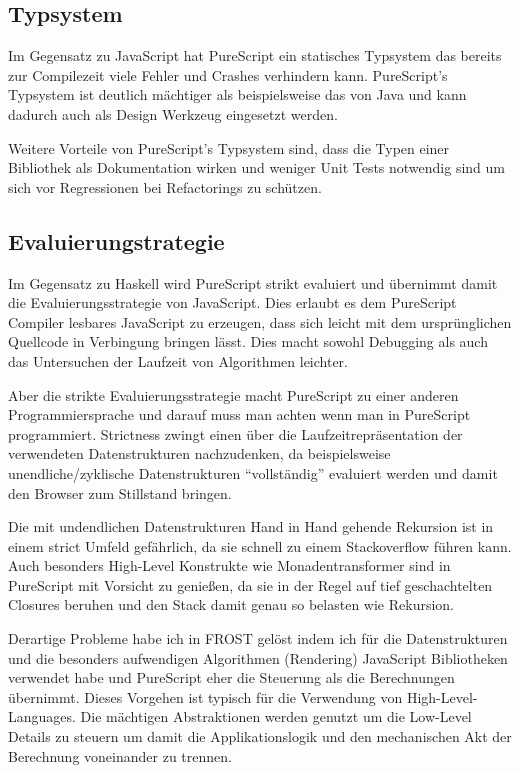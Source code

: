 \subsection*{Typsystem}
Im Gegensatz zu JavaScript hat PureScript ein statisches Typsystem das bereits
zur Compilezeit viele Fehler und Crashes verhindern kann. PureScript's Typsystem
ist deutlich mächtiger als beispielsweise das von Java und kann dadurch auch als
Design Werkzeug eingesetzt werden.

Weitere Vorteile von PureScript's Typsystem sind, dass die Typen einer
Bibliothek als Dokumentation wirken und weniger Unit Tests notwendig sind um
sich vor Regressionen bei Refactorings zu schützen.
\subsection*{Evaluierungstrategie}
Im Gegensatz zu Haskell wird PureScript strikt evaluiert und übernimmt damit die
Evaluierungsstrategie von JavaScript. Dies erlaubt es dem PureScript Compiler
lesbares JavaScript zu erzeugen, dass sich leicht mit dem ursprünglichen
Quellcode in Verbingung bringen lässt. Dies macht sowohl Debugging als auch das
Untersuchen der Laufzeit von Algorithmen leichter.

Aber die strikte Evaluierungsstrategie macht PureScript zu einer anderen
Programmiersprache und darauf muss man achten wenn man in PureScript
programmiert. Strictness zwingt einen über die Laufzeitrepräsentation der
verwendeten Datenstrukturen nachzudenken, da beispielsweise unendliche/zyklische
Datenstrukturen ``vollständig'' evaluiert werden und damit den Browser zum
Stillstand bringen.

Die mit undendlichen Datenstrukturen Hand in Hand gehende Rekursion ist in einem
strict Umfeld gefährlich, da sie schnell zu einem Stackoverflow führen kann.
Auch besonders High-Level Konstrukte wie Monadentransformer sind in PureScript
mit Vorsicht zu genießen, da sie in der Regel auf tief geschachtelten Closures
beruhen und den Stack damit genau so belasten wie Rekursion.

Derartige Probleme habe ich in FROST gelöst indem ich für die Datenstrukturen
und die besonders aufwendigen Algorithmen (Rendering) JavaScript Bibliotheken
verwendet habe und PureScript eher die Steuerung als die Berechnungen übernimmt.
Dieses Vorgehen ist typisch für die Verwendung von High-Level-Languages. Die
mächtigen Abstraktionen werden genutzt um die Low-Level Details zu steuern um
damit die Applikationslogik und den mechanischen Akt der Berechnung voneinander
zu trennen.

